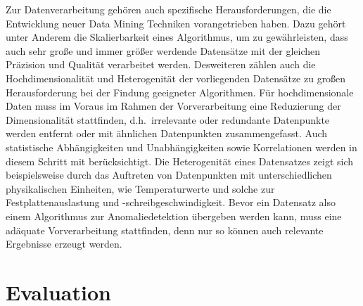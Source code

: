 Zur Datenverarbeitung gehören auch spezifische Herausforderungen, die die Entwicklung neuer Data Mining Techniken vorangetrieben haben.
Dazu gehört unter Anderem die Skalierbarkeit eines Algorithmus, um zu gewährleisten, dass auch sehr große und immer größer werdende
Datensätze mit der gleichen Präzision und Qualität verarbeitet werden. Desweiteren zählen auch die Hochdimensionalität und Heterogenität
der vorliegenden Datensätze zu großen Herausforderung bei der Findung geeigneter Algorithmen. Für hochdimensionale Daten muss im Voraus
im Rahmen der Vorverarbeitung eine Reduzierung der Dimensionalität stattfinden, d.h.~irrelevante oder redundante Datenpunkte werden
entfernt oder mit ähnlichen Datenpunkten zusammengefasst. Auch statistische Abhängigkeiten und Unabhängigkeiten sowie Korrelationen
werden in diesem Schritt mit berücksichtigt. Die Heterogenität eines Datensatzes zeigt sich beispielsweise durch das Auftreten von
Datenpunkten mit unterschiedlichen physikalischen Einheiten, wie Temperaturwerte und solche zur Festplattenauslastung und
-schreibgeschwindigkeit. Bevor ein Datensatz also einem Algorithmus zur Anomaliedetektion übergeben werden kann, muss eine adäquate
Vorverarbeitung stattfinden, denn nur so können auch relevante Ergebnisse erzeugt werden.


\newpage
\section{Evaluation}
